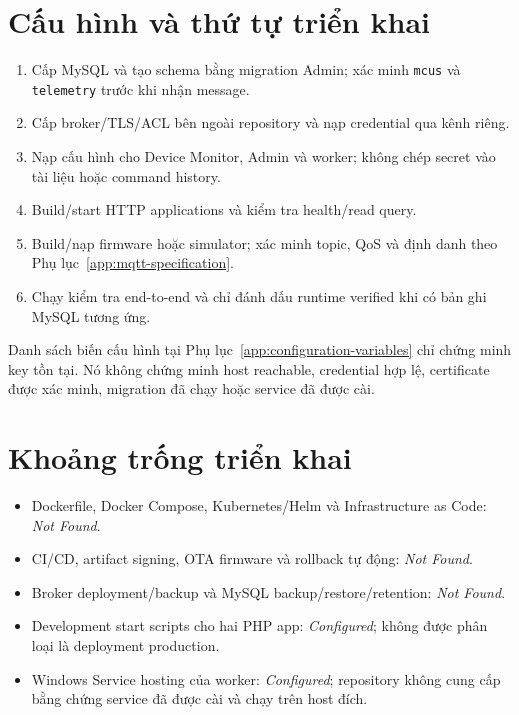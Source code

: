 \section{Cấu hình và thứ tự triển khai}

\begin{enumerate}
  \item Cấp MySQL và tạo schema bằng migration Admin; xác minh \texttt{mcus} và
  \texttt{telemetry} trước khi nhận message.
  \item Cấp broker/TLS/ACL bên ngoài repository và nạp credential qua kênh riêng.
  \item Nạp cấu hình cho Device Monitor, Admin và worker; không chép secret vào tài
  liệu hoặc command history.
  \item Build/start HTTP applications và kiểm tra health/read query.
  \item Build/nạp firmware hoặc simulator; xác minh topic, QoS và định danh theo Phụ
  lục~\ref{app:mqtt-specification}.
  \item Chạy kiểm tra end-to-end và chỉ đánh dấu runtime verified khi có bản ghi MySQL
  tương ứng.
\end{enumerate}

Danh sách biến cấu hình tại Phụ lục~\ref{app:configuration-variables} chỉ chứng minh
key tồn tại. Nó không chứng minh host reachable, credential hợp lệ, certificate được
xác minh, migration đã chạy hoặc service đã được cài.

\section{Khoảng trống triển khai}

\begin{itemize}
  \item Dockerfile, Docker Compose, Kubernetes/Helm và Infrastructure as Code:
  \textit{Not Found}.
  \item CI/CD, artifact signing, OTA firmware và rollback tự động:
  \textit{Not Found}.
  \item Broker deployment/backup và MySQL backup/restore/retention:
  \textit{Not Found}.
  \item Development start scripts cho hai PHP app: \textit{Configured}; không được
  phân loại là deployment production.
  \item Windows Service hosting của worker: \textit{Configured}; repository không cung
  cấp bằng chứng service đã được cài và chạy trên host đích.
\end{itemize}
